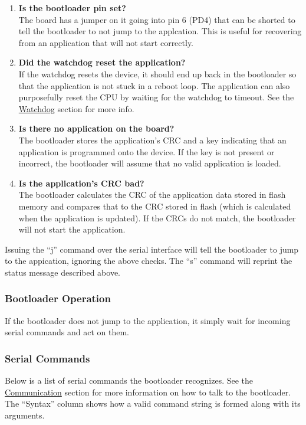 \documentclass{article}
\begin{document}
\begin{enumerate}
  \item \textbf{Is the bootloader pin set?} \\
    The board has a jumper on it going into pin 6 (PD4) that can be shorted to tell the bootloader
    to not jump to the applcation.  This is useful for recovering from an application that will
    not start correctly.
  \item \textbf{Did the watchdog reset the application?} \\
    If the watchdog resets the device, it should end up back in the bootloader so that the
    application is not stuck in a reboot loop.  The application can also purposefully reset the
    CPU by waiting for the watchdog to timeout.  See the \hyperref[ssec:FWWatchdog]{Watchdog}
    section for more info.
  \item \textbf{Is there no application on the board?} \\
    The bootloader stores the application's CRC and a key indicating that an application is
    programmed onto the device.  If the key is not present or incorrect, the bootloader will
    assume that no valid application is loaded.
  \item \textbf{Is the application's CRC bad?} \\
    The bootloader calculates the CRC of the application data stored in flash memory and compares
    that to the CRC stored in flash (which is calculated when the application is updated).  If the
    CRCs do not match, the bootloader will not start the application.
\end{enumerate}

Issuing the ``j'' command over the serial interface will tell the bootloader to jump to the
appication, ignoring the above checks.  The ``s'' command will reprint the status message described
above.

\subsubsection{Bootloader Operation} \label{sssec:FWBootOperation}
If the bootloader does not jump to the application, it simply wait for incoming serial commands and
act on them. 

\subsubsection{Serial Commands} \label{sssec:FWBootCommands}
Below is a list of serial commands the bootloader recognizes.  See the
\hyperref[ssec:FWComm]{Communication} section for more information on how to talk to the
bootloader. The ``Syntax'' column shows how a valid command string is formed along with its
arguments.
\end{document}
